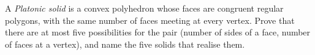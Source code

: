 A \emph{Platonic solid} is a convex polyhedron whose faces are congruent regular polygons, with the same number of faces meeting at every vertex. Prove that there are at most five possibilities for the pair (number of sides of a face, number of faces at a vertex), and name the five solids that realise them.
